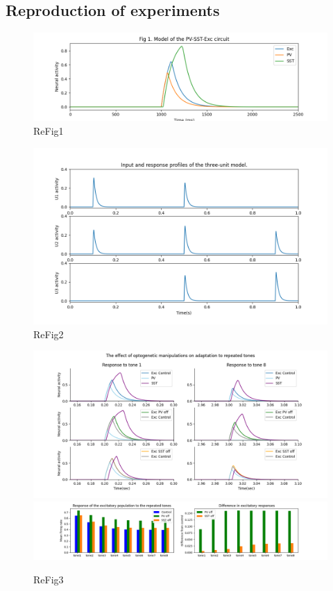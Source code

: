 \subsection{Reproduction of experiments}


\begin{figure}
 \includegraphics[width=\textwidth]{Figures/Fig1}
 \caption{ReFig1}
\end{figure}

\begin{figure}
 \includegraphics[width=\textwidth]{Figures/Fig2}
 \caption{ReFig2}
\end{figure}

\begin{figure}
 
 \includegraphics[width=\textwidth]{Figures/Fig3B}
 \includegraphics[width=\textwidth]{Figures/Fig3C}
 \caption{ReFig3}
\end{figure}

